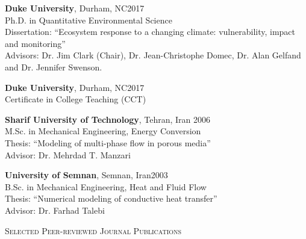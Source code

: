 \documentclass[10pt]{article}
\newenvironment{changemargin}[2]{%
  \begin{list}{}{%
 \setlength{\topsep}{0pt}%
 \setlength{\leftmargin}{#1}%
 \setlength{\rightmargin}{#2}%
 \setlength{\listparindent}{\parindent}%
 \setlength{\itemindent}{\parindent}%
 \setlength{\parsep}{\parskip}%
  }%
  \item[]}{\end{list}
}
\newcommand{\lineover}{
  \begin{changemargin}{-0.05in}{-0.05in}
  \vspace*{-8pt}
  \hrulefill \\
  \vspace*{-2pt}
  \end{changemargin}
}
\newcommand{\header}[1]{
  \begin{changemargin}{-0.5in}{-0.5in}
  \scshape{#1}\\
  \lineover
  \end{changemargin}
}
\newenvironment{body} {
  \vspace*{-2pt}
  \begin{changemargin}{-0.5in}{-0.5in}
}
{\end{changemargin}
}
\begin{document}
\begin{body}

  \textbf{Duke University}, Durham, NC\hfill {2017} \\
  {Ph.D. in Quantitative Environmental Science}\\
  Dissertation: ``Ecosystem response to a changing climate: vulnerability, impact and monitoring''\\
  Advisors: Dr. Jim Clark (Chair), Dr. Jean-Christophe Domec, Dr. Alan Gelfand and Dr. Jennifer Swenson. \\
  \medskip

  \textbf{Duke University}, Durham, NC\hfill {2017} \\
  {Certificate in College Teaching (CCT)}\\
  \medskip
  
  \textbf{Sharif University of Technology}, Tehran, Iran \hfill {2006} \\
  M.Sc. in Mechanical Engineering, Energy Conversion\\
  Thesis: ``Modeling of multi-phase flow in porous media''\\
  Advisor: Dr. Mehrdad T. Manzari\\
  \medskip

  \textbf{University of Semnan}, Semnan, Iran\hfill {2003} \\
  {B.Sc. in Mechanical Engineering, Heat and Fluid Flow} \\
  Thesis: ``Numerical modeling of conductive heat transfer''\\
  Advisor: Dr. Farhad Talebi\\
  \medskip

\end{body}

\medskip
\header{Selected Peer-reviewed Journal Publications}
\end{document}
